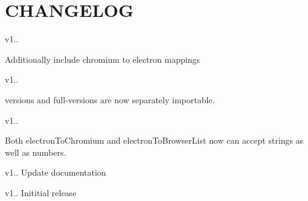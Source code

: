 \chapter{CHANGELOG}
\hypertarget{md__d_1_2_g_i_t_2_food_link_2foodlink_8client_2node__modules_2electron-to-chromium_2_c_h_a_n_g_e_l_o_g}{}\label{md__d_1_2_g_i_t_2_food_link_2foodlink_8client_2node__modules_2electron-to-chromium_2_c_h_a_n_g_e_l_o_g}
v1..
\begin{DoxyItemize}
\item Additionally include chromium to electron mappings
\end{DoxyItemize}

v1..
\begin{DoxyItemize}
\item versions and full-\/versions are now separately importable.
\end{DoxyItemize}

v1..
\begin{DoxyItemize}
\item Both electron\+To\+Chromium and electron\+To\+Browser\+List now can accept strings as well as numbers.
\end{DoxyItemize}

v1.. Update documentation

v1.. Inititial release 